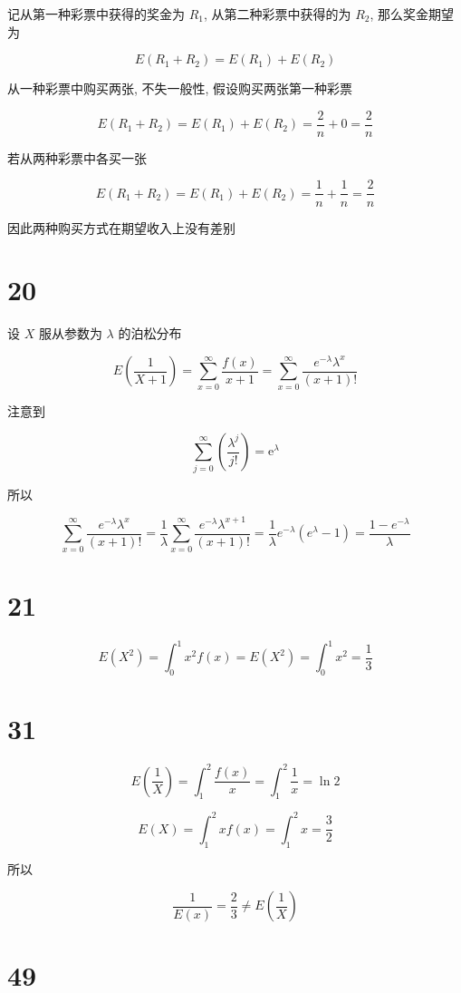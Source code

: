 \documentclass[]{article}
\begin{document}
记从第一种彩票中获得的奖金为 \(R_1\), 从第二种彩票中获得的为 \(R_2\),
那么奖金期望为

\[E(R_1+R_2)=E(R_1)+E(R_2)\]

从一种彩票中购买两张, 不失一般性, 假设购买两张第一种彩票

\[E(R_1+R_2)=E(R_1)+E(R_2)=\frac{2}{n}+0=\frac{2}{n}\]

若从两种彩票中各买一张

\[E(R_1+R_2)=E(R_1)+E(R_2)=\frac{1}{n}+\frac{1}{n}=\frac{2}{n}\]

因此两种购买方式在期望收入上没有差别

\section{20}\label{header-n24}

设 \(X\) 服从参数为 \(\lambda\) 的泊松分布

\[E(\frac{1}{X+1})=\sum_{x=0}^{\infty}\frac{f(x)}{x+1}=\sum_{x=0}^{\infty}\frac{e^{-\lambda } \lambda ^x}{(x+1)!}\]

注意到

\[\sum_{j=0}^{\infty}\left(\frac{\lambda^{j} }{ j !}\right)=\mathrm{e}^{\lambda}\]

所以

\[\sum_{x=0}^{\infty}\frac{e^{-\lambda } \lambda ^x}{(x+1)!}=\frac{1}{\lambda}\sum_{x=0}^{\infty}\frac{e^{-\lambda } \lambda ^{x+1}}{(x+1)!}=\frac{1}{\lambda}e^{-\lambda}(e^\lambda-1)=\frac{1-e^{-\lambda }}{\lambda }\]

\section{21}\label{header-n32}

\[E(X^2)=\int_0^1 x^2f(x)=E(X^2)=\int_0^1 x^2=\frac{1}{3}\]

\section{31}\label{header-n34}

\[E(\frac{1}{X})=\int_1^2{\frac{f(x)}{x}}=\int_1^2{\frac{1}{x}}=\ln2\]

\[E(X)=\int_1^2{xf(x)}=\int_1^2{x}=\frac{3}{2}\]

所以

\[\frac{1}{E(x)}=\frac{2}{3}\neq E(\frac{1}{X})\]

\section{49}\label{header-n39}
\end{document}
